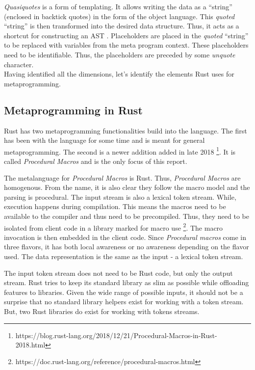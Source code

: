 \textit{Quasiquotes} is a form of templating.
It allows writing the data as a ``string'' (enclosed in backtick quotes) in the form of the object language.
This \textit{quoted} ``string'' is then transformed into the desired data structure.
Thus, it acts as a shortcut for constructing an AST \cite{lilis_15_01}.
Placeholders are placed in the \textit{quoted} ``string'' to be replaced with variables from the meta program context.
These placeholders need to be identifiable.
Thus, the placeholders are preceded by some \textit{unquote} character. \cite{bawden_99_01} \\

Having identified all the dimensions, let's identify the elements Rust uses for metaprogramming.

\subsection{Metaprogramming in Rust}
Rust has two metaprogramming functionalities build into the language.
The first has been with the language for some time and is meant for general metaprogramming.
The second is a newer addition added in late 2018 \footnote{https://blog.rust-lang.org/2018/12/21/Procedural-Macros-in-Rust-2018.html}.
It is called \textit{Procedural Macros} and is the only focus of this report. \cite{klabnik_2019_01}

The metalanguage for \textit{Procedural Macros} is Rust.
Thus, \textit{Procedural Macros} are homogenous.
From the name, it is also clear they follow the macro model and the parsing is procedural.
The input stream is also a lexical token stream.
While, execution happens during compilation.
This means the macros need to be available to the compiler and thus need to be precompiled.
Thus, they need to be isolated from client code in a library marked for macro use \footnote{https://doc.rust-lang.org/reference/procedural-macros.html}.
The macro invocation is then embedded in the client code.
Since \textit{Procedural macros} come in three flavors, it has both local awareness or no awareness depending on the flavor used.
The data representation is the same as the input - a lexical token stream.

The input token stream does not need to be Rust code, but only the output stream.
Rust tries to keep its standard library as slim as possible while offloading features to libraries.
Given the wide range of possible inputs, it should not be a surprise that no standard library helpers exist for working with a token stream.
But, two Rust libraries do exist for working with tokens streams.

